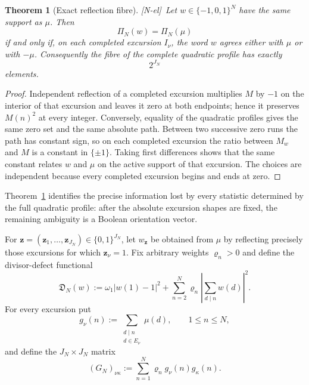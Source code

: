 \documentclass[11pt]{amsart}
\numberwithin{equation}{section}
\theoremstyle{plain}
\newtheorem{theorem}{Theorem}[section]
\theoremstyle{definition}
\theoremstyle{remark}
\newcommand{\tagNE}{\textup{[N-el]}}
\begin{document}
\begin{theorem}[Exact reflection fibre]
\label{thm:exact-reflection-fibre}
\tagNE\ Let $w\in\{-1,0,1\}^N$ have the same support as $\mu$.  Then
\[
\Pi_N(w)=\Pi_N(\mu)
\]
if and only if, on each completed excursion $I_\nu$, the word $w$ agrees either with $\mu$ or with $-\mu$.  Consequently the fibre of the complete quadratic profile has exactly
\[
2^{J_N}
\]
elements.
\end{theorem}

\begin{proof}
Independent reflection of a completed excursion multiplies $M$ by $-1$ on the interior of that excursion and leaves it zero at both endpoints; hence it preserves $M(n)^2$ at every integer.  Conversely, equality of the quadratic profiles gives the same zero set and the same absolute path.  Between two successive zero runs the path has constant sign, so on each completed excursion the ratio between $M_w$ and $M$ is a constant in $\{\pm1\}$.  Taking first differences shows that the same constant relates $w$ and $\mu$ on the active support of that excursion.  The choices are independent because every completed excursion begins and ends at zero.
\end{proof}

Theorem~\ref{thm:exact-reflection-fibre} identifies the precise information lost by every statistic determined by the full quadratic profile: after the absolute excursion shapes are fixed, the remaining ambiguity is a Boolean orientation vector.

For $\mathbf z=(\mathbf z_1,\dots,\mathbf z_{J_N})\in\{0,1\}^{J_N}$, let $w_\mathbf z$ be obtained from $\mu$ by reflecting precisely those excursions for which $\mathbf z_\nu=1$.  Fix arbitrary weights $\varrho_n>0$ and define the divisor-defect functional
\begin{equation}
\mathfrak D_N(w)
:=
\omega_1|w(1)-1|^2
+
\sum_{n=2}^N\varrho_n
\left|\sum_{d\mid n}w(d)\right|^2.
\label{eq:divisor-defect-functional}
\end{equation}
For every excursion put
\begin{equation}
g_\nu(n):=
\sum_{\substack{d\mid n\\ d\in E_\nu}}\mu(d),
\qquad 1\le n\le N,
\label{eq:excursion-divisor-signal-new}
\end{equation}
and define the $J_N\times J_N$ matrix
\begin{equation}
(G_N)_{\nu\kappa}
:=
\sum_{n=1}^N\varrho_n g_\nu(n)g_\kappa(n).
\label{eq:orientation-gram-new}
\end{equation}
\end{document}
